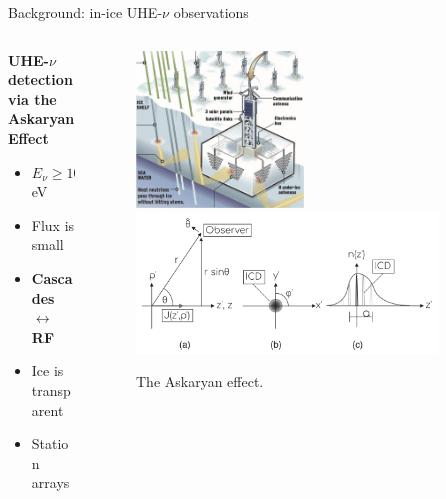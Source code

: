 \documentclass{beamer}
\begin{document}
\begin{frame}{Background: in-ice UHE-$\nu$ observations}
\small
\begin{columns}[T]
\begin{column}{0.32\textwidth}
\textbf{\alert{UHE-$\nu$ detection via the Askaryan Effect}}
\begin{itemize}
\item $E_{\nu} \geq 10^{16}$ eV
\item Flux is small
\item \textbf{Cascades $\leftrightarrow$ RF}
\item Ice is transparent
\item Station arrays
\end{itemize}
\end{column}
\begin{column}{0.68\textwidth}
\begin{figure}
\centering
\includegraphics[width=0.5\textwidth]{ARIANNA_principle.png}
\includegraphics[width=0.9\textwidth]{icd.png}
\caption{\footnotesize The Askaryan effect.}
\end{figure}
\end{column}
\end{columns}
\end{frame}
\end{document}
